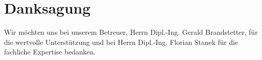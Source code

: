 \section{Danksagung}
Wir möchten uns bei unserem Betreuer, Herrn Dipl.-Ing. Gerald Brandstetter, für die wertvolle Unterstützung und bei Herrn Dipl.-Ing. Florian Stanek für die fachliche Expertise bedanken.  